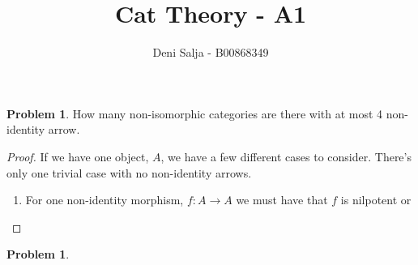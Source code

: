 \documentclass[11pt]{amsart}
\title{Cat Theory - A1 }
\author{Deni Salja - B00868349}
\theoremstyle{plain}
\theoremstyle{definition}
\newtheorem{prob}[thm]{Problem}
\begin{document}
\maketitle

\begin{prob}
How many non-isomorphic categories are there with at most 4 non-identity arrow.
\end{prob} 
\begin{proof}
If we have one object, $A$, we have a few different cases to consider. There's only one trivial case with no non-identity arrows. 

\begin{enumerate}[label=(\alph*)]
\item For one non-identity morphism, $f : A \to A$ we must have that $f$ is nilpotent or 
\end{enumerate}
\end{proof}




\begin{prob}

\end{prob}
\end{document}
